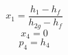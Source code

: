 

\item[c)] 
    \[
    x_1 = \frac{h_1 - h_f}{h_{2g} - h_f}
    \]
    \[
    x_4 = 0
    \]
    \[
    p_4 = h_4
    \]